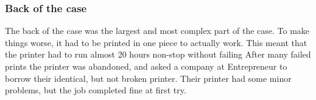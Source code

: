 \subsubsection*{Back of the case}
The back of the case was the largest and most complex part of the case.
To make things worse, it had to be printed in one piece to actually work.
This meant that the printer had to run almost 20 hours non-stop without failing
After many failed prints the printer was abandoned, and asked a company at Entrepreneur  to borrow their identical, but not broken printer.
Their printer had some minor problems, but the job completed fine at first try.

